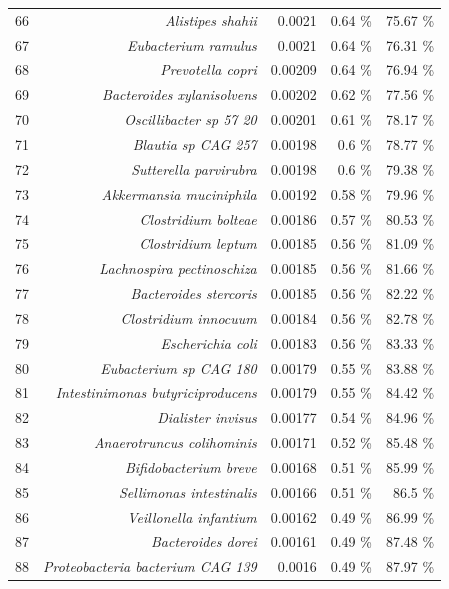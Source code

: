 \documentclass{article}
\begin{document}
\begin{table}[h]
\begin{centering}
\begin{tabular}{|r|r|r|r|r|}
      66 & \textit{Alistipes shahii} & 0.0021 & 0.64 \% & 75.67 \% \\
      67 & \textit{Eubacterium ramulus} & 0.0021 & 0.64 \% & 76.31 \% \\
      68 & \textit{Prevotella copri} & 0.00209 & 0.64 \% & 76.94 \% \\
      69 & \textit{Bacteroides xylanisolvens} & 0.00202 & 0.62 \% & 77.56 \% \\
      70 & \textit{Oscillibacter sp 57 20} & 0.00201 & 0.61 \% & 78.17 \% \\
      71 & \textit{Blautia sp CAG 257} & 0.00198 & 0.6 \% & 78.77 \% \\
      72 & \textit{Sutterella parvirubra} & 0.00198 & 0.6 \% & 79.38 \% \\
      73 & \textit{Akkermansia muciniphila} & 0.00192 & 0.58 \% & 79.96 \% \\
      74 & \textit{Clostridium bolteae} & 0.00186 & 0.57 \% & 80.53 \% \\
      75 & \textit{Clostridium leptum} & 0.00185 & 0.56 \% & 81.09 \% \\
      76 & \textit{Lachnospira pectinoschiza} & 0.00185 & 0.56 \% & 81.66 \% \\
      77 & \textit{Bacteroides stercoris} & 0.00185 & 0.56 \% & 82.22 \% \\
      78 & \textit{Clostridium innocuum} & 0.00184 & 0.56 \% & 82.78 \% \\
      79 & \textit{Escherichia coli} & 0.00183 & 0.56 \% & 83.33 \% \\
      80 & \textit{Eubacterium sp CAG 180} & 0.00179 & 0.55 \% & 83.88 \% \\
      81 & \textit{Intestinimonas butyriciproducens} & 0.00179 & 0.55 \% & 84.42 \% \\
      82 & \textit{Dialister invisus} & 0.00177 & 0.54 \% & 84.96 \% \\
      83 & \textit{Anaerotruncus colihominis} & 0.00171 & 0.52 \% & 85.48 \% \\
      84 & \textit{Bifidobacterium breve} & 0.00168 & 0.51 \% & 85.99 \% \\
      85 & \textit{Sellimonas intestinalis} & 0.00166 & 0.51 \% & 86.5 \% \\
      86 & \textit{Veillonella infantium} & 0.00162 & 0.49 \% & 86.99 \% \\
      87 & \textit{Bacteroides dorei} & 0.00161 & 0.49 \% & 87.48 \% \\
      88 & \textit{Proteobacteria bacterium CAG 139} & 0.0016 & 0.49 \% & 87.97 \% \\

\end{tabular}
\end{centering}
\end{table}
\end{document}
